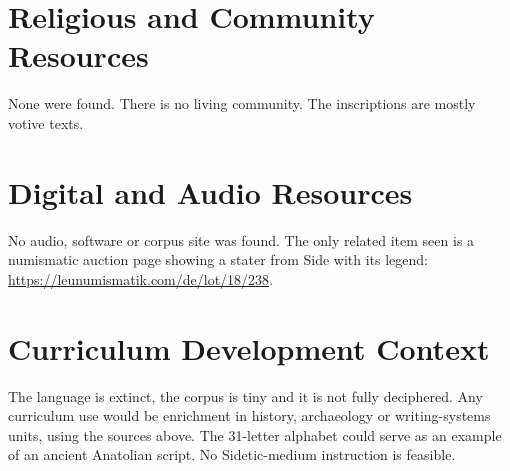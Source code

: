\documentclass[12pt]{article}
\begin{document}
\section{Religious and Community Resources}
None were found. There is no living community. The inscriptions are mostly votive texts.

\section{Digital and Audio Resources}
No audio, software or corpus site was found. The only related item seen is a numismatic auction page showing a stater from Side with its legend: \url{https://leunumismatik.com/de/lot/18/238}.

\section{Curriculum Development Context}
The language is extinct, the corpus is tiny and it is not fully deciphered. Any curriculum use would be enrichment in history, archaeology or writing-systems units, using the sources above. The 31-letter alphabet could serve as an example of an ancient Anatolian script. No Sidetic-medium instruction is feasible.
\end{document}
